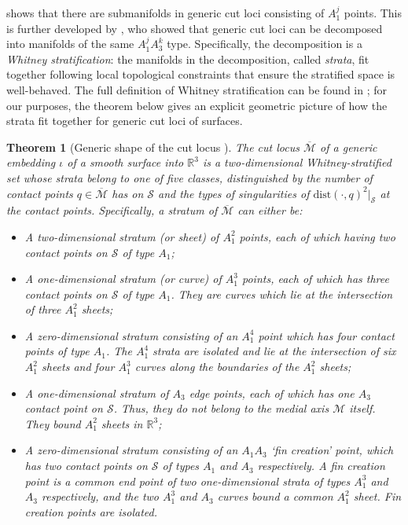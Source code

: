 \documentclass[11pt]{article}
\newcommand{\R}{\mathbb{R}}
\newcommand{\dist}{\mathrm{dist}}
\newcommand{\med}{\mathcal{M}}
\newcommand{\Surf}{\mathcal{S}}
\theoremstyle{plain}
\newtheorem{thm}{Theorem}
\theoremstyle{definition}
\theoremstyle{remark}
\begin{document}
 shows that there are submanifolds in generic cut loci consisting of $A_1^j$ points. This is further developed by \cite{mather_distance_1983}, who showed that generic cut loci can be decomposed into manifolds of the same $A_1^jA_3^k$ type. Specifically, the decomposition is a \emph{Whitney stratification}: the manifolds in the decomposition, called \emph{strata}, fit together following local topological constraints that ensure the stratified space is well-behaved. The full definition of Whitney stratification can be found in  \cite{goresky_stratified_1988}; for our purposes, the theorem below gives an explicit geometric picture of how the strata fit together for generic cut loci of surfaces.

\begin{thm}[Generic shape of the cut locus \citep{mather_distance_1983, giblin_symmetry_2000, cazals_differential_2005, damon_global_2006}]
	\label{thm:generic_cut_locus}
The cut locus $\overline{\med}$ of a generic embedding $\iota$ of a smooth surface into $\R^3$ is a two-dimensional Whitney-stratified set whose strata belong to one of five classes, distinguished by the number of contact points $q \in \overline{\med}$ has on $\Surf$ and the types of singularities of $\dist(\cdot, q)^2\rvert_\Surf$ at the contact points. Specifically, a stratum of $\overline{\med}$ can either be:
\begin{itemize}
\item A two-dimensional stratum (or sheet) of $A_1^2$ points, each of which having two contact points on $\Surf$ of type $A_1$;
\item A one-dimensional stratum (or curve) of $A_1^3$ points, each of which has three contact points on $\Surf$ of type $A_1$. They are curves which lie at the intersection of three $A_1^2$ sheets; 
\item A zero-dimensional stratum consisting of an $A_1^4$ point which has four contact points of type $A_1$. The $A_1^4$ strata are isolated and lie at the intersection of six $A_1^2$ sheets and four $A_1^3$ curves along the boundaries of the $A_1^2$ sheets;
\item A one-dimensional stratum of $A_3$ edge points, each of which has one $A_3$ contact point on $\Surf$. Thus, they do not belong to the medial axis $\mathcal{M}$ itself. They bound $A_1^2$ sheets in $\R^3$;
\item A zero-dimensional stratum consisting of an $A_1 A_3$ `\emph{fin creation}' point, which has two contact points on $\Surf$ of types $A_1$ and $A_3$ respectively. A fin creation point is a common end point of two one-dimensional strata of types $A_1^3$ and $A_3$ respectively, and the two $A_1^3$ and $A_3$ curves bound a common $A_1^2$ sheet. Fin creation points are isolated.
\end{itemize}
\end{thm}
\end{document}
